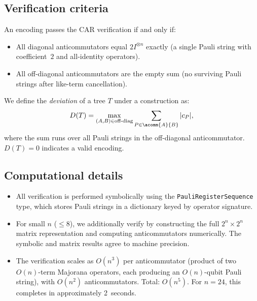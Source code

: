 \subsection*{Verification criteria}

An encoding passes the CAR verification if and only if:
\begin{itemize}
  \item All diagonal anticommutators equal $2I^{\otimes n}$ exactly
    (a single Pauli string with coefficient~$2$ and all-identity
    operators).
  \item All off-diagonal anticommutators are the empty sum (no
    surviving Pauli strings after like-term cancellation).
\end{itemize}

We define the \emph{deviation} of a tree $T$ under a construction as:
\begin{equation}
  D(T) = \max_{(A,B) \in \text{off-diag}}
    \sum_{P \in \acomm{A}{B}} |c_P|,
\end{equation}
where the sum runs over all Pauli strings in the off-diagonal
anticommutator.  $D(T) = 0$ indicates a valid encoding.

\subsection*{Computational details}

\begin{itemize}
  \item All verification is performed symbolically using the
    \texttt{PauliRegisterSequence} type, which stores Pauli strings
    in a dictionary keyed by operator signature.
  \item For small $n$ ($\le 8$), we additionally verify by
    constructing the full $2^n \times 2^n$ matrix representation
    and computing anticommutators numerically.  The symbolic and
    matrix results agree to machine precision.
  \item The verification scales as $O(n^3)$ per anticommutator
    (product of two $O(n)$-term Majorana operators, each producing
    an $O(n)$-qubit Pauli string), with $O(n^2)$
    anticommutators.  Total: $O(n^5)$.  For $n = 24$, this completes
    in approximately 2~seconds.
\end{itemize}

